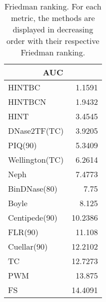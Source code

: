\documentclass[landscape, 6pt]{report}
\begin{document}
\begin{table}[h!]
\label{tab:ranking}
\vspace{0.0cm}
\begin{center}
\caption{Friedman ranking. For each metric, the methods are displayed in decreasing order with their respective Friedman ranking.}
\renewcommand{\arraystretch}{1.2}
  \begin{tabular}{ |lr| }
    \hline
    \multicolumn{2}{|c|}{\textbf{AUC}} \\
    \hline
    HINTBC & 1.1591 \\
    HINTBCN & 1.9432 \\
    HINT & 3.4545 \\
    DNase2TF(TC) & 3.9205 \\
    PIQ(90) & 5.3409 \\
    Wellington(TC) & 6.2614 \\
    Neph & 7.4773 \\
    BinDNase(80) & 7.75 \\
    Boyle & 8.125 \\
    Centipede(90) & 10.2386 \\
    FLR(90) & 11.108 \\
    Cuellar(90) & 12.2102 \\
    TC & 12.7273 \\
    PWM & 13.875 \\
    FS & 14.4091 \\
    \hline
  \end{tabular}
\end{center}
\vspace{0.0cm}
\end{table}
\end{document}
